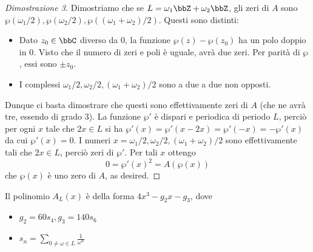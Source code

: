 \begin{proof}[Dimostrazione 3]
Dimostriamo che se $L=\omega_1\bbZ + \omega_2 \bbZ$, gli zeri di $A$ sono $ \wp(\omega_1/2), \wp(\omega_2/2), \wp((\omega_1+\omega_2)/2)$. Questi sono distinti: 
\begin{itemize}
\item Dato $z_0 \in \bbC$ diverso da 0, la funzione $\wp(z) - \wp(z_0)$ ha un polo doppio in 0. Visto che il numero di zeri e poli è uguale, avrà due zeri. Per parità di $\wp$, essi sono $\pm z_0$. 
\item I complessi $\omega_1/2, \omega_2/2, (\omega_1+\omega_2)/2$ sono a due a due non opposti.
\end{itemize} 
Dunque ci basta dimostrare che questi sono effettivamente zeri di $A$ (che ne avrà tre, essendo di grado 3). La funzione $\wp'$ è dispari e periodica di periodo $L$, perciò per ogni $x$ tale che $2x \in L$ si ha
$\wp'(x) = \wp'(x-2x) = \wp'(-x) = -\wp'(x)$
da cui $\wp'(x) = 0$. I numeri $x=\omega_1/2, \omega_2/2, (\omega_1+\omega_2)/2$ sono effettivamente tali che $2x \in L$, perciò zeri di $\wp'$. Per tali $x$ ottengo
$$ 0 = \wp'(x)^2 = A(\wp(x))$$
che $\wp(x)$ è uno zero di $A$, as desired.
\end{proof}

\begin{proposizione}
Il polinomio $A_L(x)$ è della forma $4x^3-g_2x-g_3$, dove
\begin{itemize}
\item $g_2=60s_4, g_3=140s_6$
\item $\displaystyle s_n = \sum_{0 \neq \omega \in L} \frac{1}{\omega^n} $
\end{itemize} 

\end{proposizione}

